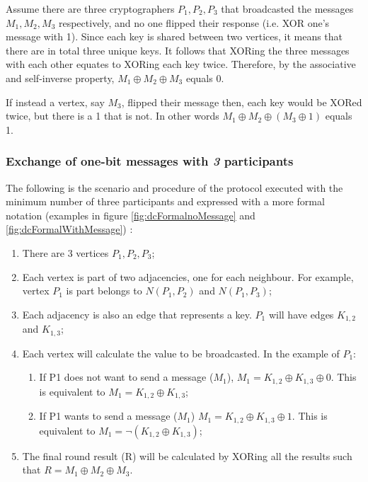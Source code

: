 Assume there are three cryptographers $P_1, P_2, P_3$ that broadcasted the messages $M_1, M_2, M_3$ respectively, and no one flipped their response (i.e. XOR one's message with 1). Since each key is shared between two vertices, it means that there are in total three unique keys. It follows that XORing the three messages with each other equates to XORing each key twice. Therefore, by the associative and self-inverse property, $M_1 \oplus M_2 \oplus M_3$ equals 0. 

If instead a vertex, say $M_3$, flipped their message then, each key would be XORed twice, but there is a 1 that is not. In other words $M_1 \oplus M_2 \oplus (M_3 \oplus 1)$ equals 1.



\subsubsection{Exchange of one-bit messages with \textit{3} participants}
The following is the scenario and procedure of the protocol executed with the minimum number of three participants and expressed with a more formal notation (examples in figure \ref{fig:dcFormalnoMessage} and \ref{fig:dcFormalWithMessage}) :
\begin{enumerate}
    \item There are 3 vertices \textit{$P_1, P_2, P_3$};
    \item Each vertex is part of two adjacencies, one for each neighbour. For example, vertex \textit{$P_1$} is part belongs to \textit{$N(P_1,P_2)$} and \textit{$N(P_1, P_3)$};
    \item Each adjacency is also an edge that represents a key. \textit{$P_1$} will have edges \textit{$K_{1,2}$} and \textit{$K_{1,3}$};
    \item Each vertex will calculate the value to be broadcasted. In the example of \textit{$P_1$}: 
    \begin{enumerate}
        \item If P1 does not want to send a message ($M_1$), \textit{$M_1 = K_{1,2} \oplus K_{1,3} \oplus 0 $}. This is equivalent to \textit{$M_1 = K_{1,2} \oplus K_{1,3}$};
        \item If P1 wants to send a message ($M_1$) \textit{$M_1 = K_{1,2} \oplus K_{1,3} \oplus 1 $}. This is equivalent to \textit{$M_1 = \neg(K_{1,2} \oplus K_{1,3}) $};
    \end{enumerate}
    \item The final round result (R) will be calculated by XORing all the results such that \textit{$R = M_1 \oplus M_2 \oplus M_3$}.
\end{enumerate}


